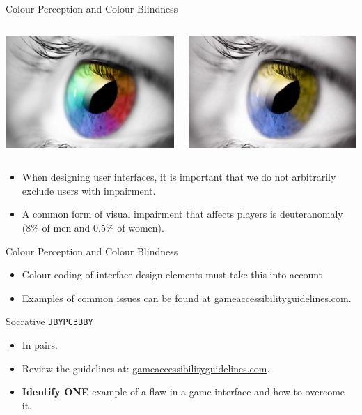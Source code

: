 \begin{frame}{Colour Perception and Colour Blindness}
	\begin{columns}[onlytextwidth]
		\begin{column}{0.45\textwidth}
			\includegraphics[height=16ex]{normal_vision.jpg}
		\end{column}
		\begin{column}{0.45\textwidth}
			\includegraphics[height=16ex]{anomalous_vision.jpg}
		\end{column}
	\end{columns}
	
	\vspace{2ex}
	
	\begin{itemize}
		\item When designing user interfaces, it is important that we do not arbitrarily exclude users with impairment. 
		\item A common form of visual impairment that affects players is deuteranomaly (8\% of men and 0.5\% of women).
	\end{itemize}
\end{frame}

\begin{frame}{Colour Perception and Colour Blindness}
	\begin{itemize}
		\item Colour coding of interface design elements must take this into account
		\item Examples of common issues can be found at \url{gameaccessibilityguidelines.com}.
	\end{itemize}
\end{frame}

\begin{frame}[fragile]{Socrative \texttt{JBYPC3BBY}}
	\begin{itemize}
		\item In pairs.
		\item Review the guidelines at: \url{gameaccessibilityguidelines.com}.
		\item \textbf{Identify ONE} example of a flaw in a game interface and how to overcome it.
	\end{itemize}
\end{frame}

